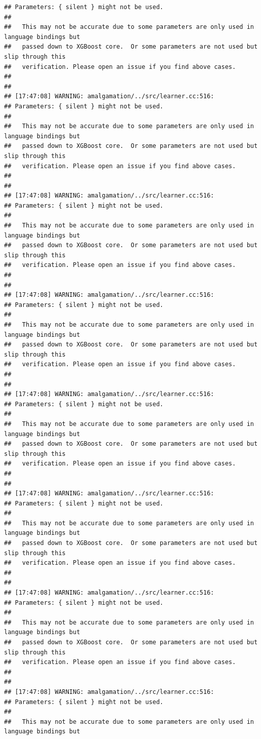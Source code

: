 \documentclass[AMS,STIX2COL]{WileyNJD-v2}\usepackage[]{graphicx}\usepackage[]{color}
\makeatletter
\newenvironment{kframe}{%
 \def\at@end@of@kframe{}%
 \ifinner\ifhmode%
  \def\at@end@of@kframe{\end{minipage}}%
  \begin{minipage}{\columnwidth}%
 \fi\fi%
 \def\FrameCommand##1{\hskip\@totalleftmargin \hskip-\fboxsep
 \colorbox{shadecolor}{##1}\hskip-\fboxsep
     \hskip-\linewidth \hskip-\@totalleftmargin \hskip\columnwidth}%
 \MakeFramed {\advance\hsize-\width
   \@totalleftmargin\z@ \linewidth\hsize
   \@setminipage}}%
 {\par\unskip\endMakeFramed%
 \at@end@of@kframe}
\newenvironment{knitrout}{}{} %
\makeatother
\begin{document}
\begin{knitrout}
\begin{kframe}
\begin{verbatim}
## Parameters: { silent } might not be used.
## 
##   This may not be accurate due to some parameters are only used in language bindings but
##   passed down to XGBoost core.  Or some parameters are not used but slip through this
##   verification. Please open an issue if you find above cases.
## 
## 
## [17:47:08] WARNING: amalgamation/../src/learner.cc:516: 
## Parameters: { silent } might not be used.
## 
##   This may not be accurate due to some parameters are only used in language bindings but
##   passed down to XGBoost core.  Or some parameters are not used but slip through this
##   verification. Please open an issue if you find above cases.
## 
## 
## [17:47:08] WARNING: amalgamation/../src/learner.cc:516: 
## Parameters: { silent } might not be used.
## 
##   This may not be accurate due to some parameters are only used in language bindings but
##   passed down to XGBoost core.  Or some parameters are not used but slip through this
##   verification. Please open an issue if you find above cases.
## 
## 
## [17:47:08] WARNING: amalgamation/../src/learner.cc:516: 
## Parameters: { silent } might not be used.
## 
##   This may not be accurate due to some parameters are only used in language bindings but
##   passed down to XGBoost core.  Or some parameters are not used but slip through this
##   verification. Please open an issue if you find above cases.
## 
## 
## [17:47:08] WARNING: amalgamation/../src/learner.cc:516: 
## Parameters: { silent } might not be used.
## 
##   This may not be accurate due to some parameters are only used in language bindings but
##   passed down to XGBoost core.  Or some parameters are not used but slip through this
##   verification. Please open an issue if you find above cases.
## 
## 
## [17:47:08] WARNING: amalgamation/../src/learner.cc:516: 
## Parameters: { silent } might not be used.
## 
##   This may not be accurate due to some parameters are only used in language bindings but
##   passed down to XGBoost core.  Or some parameters are not used but slip through this
##   verification. Please open an issue if you find above cases.
## 
## 
## [17:47:08] WARNING: amalgamation/../src/learner.cc:516: 
## Parameters: { silent } might not be used.
## 
##   This may not be accurate due to some parameters are only used in language bindings but
##   passed down to XGBoost core.  Or some parameters are not used but slip through this
##   verification. Please open an issue if you find above cases.
## 
## 
## [17:47:08] WARNING: amalgamation/../src/learner.cc:516: 
## Parameters: { silent } might not be used.
## 
##   This may not be accurate due to some parameters are only used in language bindings but

\end{verbatim}
\end{kframe}
\end{knitrout}
\end{document}
